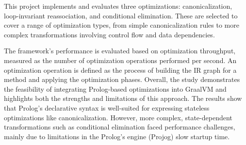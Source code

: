 This project implements and evaluates three optimizations: canonicalization, loop-invariant reassociation, and conditional elimination. These are selected to cover a range of optimization types, from simple canonicalization rules to more complex transformations involving control flow and data dependencies.

The framework’s performance is evaluated based on optimization throughput, measured as the number of optimization operations performed per second.
An optimization operation is defined as the process of building the IR graph for a method and applying the optimization phases.
Overall, the study demonstrates the feasibility of integrating Prolog-based optimizations into GraalVM and highlights both the strengths and limitations of this approach.
The results show that Prolog’s declarative syntax is well-suited for expressing stateless optimizations like canonicalization. However, more complex, state-dependent transformations such as conditional elimination faced performance challenges, mainly due to limitations in the Prolog’s engine (Projog) slow startup time.
